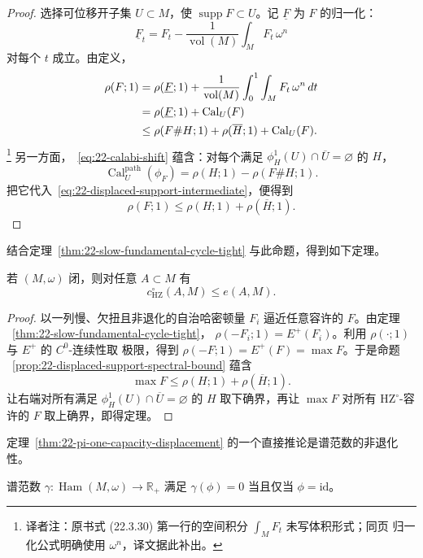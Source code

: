 \begin{proof}
选择可位移开子集 $U\subset M$，使 $\operatorname{supp}F\subset U$。记
$\underline F$ 为 $F$ 的归一化：
\[
 \underline F_t=F_t-\frac1{\operatorname{vol}(M)}\int_MF_t\,\omega^n
\]
对每个 $t$ 成立。由定义，
\begin{align}
 \rho(F;1)
 &=\rho(\underline F;1)+\frac1{\operatorname{vol}(M)}
 \int_0^1\int_MF_t\,\omega^n\,dt\notag\\
 &=\rho(\underline F;1)+\operatorname{Cal}_U(F)\notag\\
 &\leq\rho(F\#H;1)+\rho(\overline H;1)+\operatorname{Cal}_U(F).
 \label{eq:22-displaced-support-intermediate}
\end{align}
\footnote{译者注：原书式 (22.3.30) 第一行的空间积分 $\int_MF_t$ 未写体积形式；同页
归一化公式明确使用 $\omega^n$，译文据此补出。}
另一方面，~\eqref{eq:22-calabi-shift} 蕴含：对每个满足
$\phi_H^1(U)\cap\overline U=\varnothing$ 的 $H$，
\[
 \operatorname{Cal}_U^{\mathrm{path}}(\phi_F)
 =\rho(H;1)-\rho(F\#H;1).
\]
把它代入~\eqref{eq:22-displaced-support-intermediate}，便得到
\[
 \rho(F;1)\leq\rho(H;1)+\rho(\overline H;1).
\]
\end{proof}

结合定理~\ref{thm:22-slow-fundamental-cycle-tight} 与此命题，得到如下定理。

\begin{theorem}[厄舍]
\label{thm:22-pi-one-capacity-displacement}
若 $(M,\omega)$ 闭，则对任意 $A\subset M$ 有
\[
 c_{\mathrm{HZ}}^\circ(A,M)\leq e(A,M).
\]
\end{theorem}

\begin{proof}
以一列慢、欠扭且非退化的自治哈密顿量 $F_i$ 逼近任意容许的 $F$。由定理
~\ref{thm:22-slow-fundamental-cycle-tight}，
$\rho(-F_i;1)=E^+(F_i)$。利用 $\rho(\mathord\cdot;1)$ 与 $E^+$ 的 $C^0$-连续性取
极限，得到 $\rho(-F;1)=E^+(F)=\max F$。于是命题
~\ref{prop:22-displaced-support-spectral-bound} 蕴含
\[
 \max F\leq\rho(H;1)+\rho(\overline H;1).
\]
让右端对所有满足 $\phi_H^1(U)\cap\overline U=\varnothing$ 的 $H$ 取下确界，再让
$\max F$ 对所有 $\mathrm{HZ}^\circ$-容许的 $F$ 取上确界，即得定理。
\end{proof}

定理~\ref{thm:22-pi-one-capacity-displacement} 的一个直接推论是谱范数的非退化性。

\begin{corollary}
\label{cor:22-spectral-norm-nondegenerate}
谱范数 $\gamma:\operatorname{Ham}(M,\omega)\to\mathbb R_+$ 满足
$\gamma(\phi)=0$ 当且仅当 $\phi=\mathrm{id}$。
\end{corollary}

